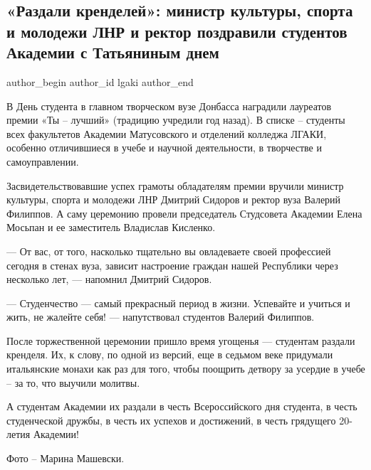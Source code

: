  
 
 
 
 
 
\subsection{«Раздали кренделей»: министр культуры, спорта и молодежи ЛНР и ректор поздравили студентов Академии с Татьяниным днем}
\label{sec:25_01_2022.stz.edu.lnr.lgaki.1.razdali_krendelej_tatjanin_den}
 
\ifcmt
 author_begin
   author_id lgaki
 author_end
\fi

В День студента в главном творческом вузе Донбасса наградили лауреатов премии
«Ты – лучший» (традицию учредили год назад). В списке – студенты всех
факультетов Академии Матусовского и отделений колледжа ЛГАКИ, особенно
отличившиеся в учебе и научной деятельности, в творчестве и самоуправлении.


Засвидетельствовавшие успех грамоты обладателям премии вручили министр
культуры, спорта и молодежи ЛНР Дмитрий Сидоров и ректор вуза Валерий Филиппов.
А саму церемонию провели председатель Студсовета Академии Елена Мосьпан и ее
заместитель Владислав Кисленко.


— От вас, от того, насколько тщательно вы овладеваете своей профессией сегодня
в стенах вуза, зависит настроение граждан нашей Республики через несколько лет,
— напомнил Дмитрий Сидоров.

— Студенчество — самый прекрасный период в жизни. Успевайте и учиться и жить,
не жалейте себя! — напутствовал студентов Валерий Филиппов.

После торжественной церемонии пришло время угощенья — студентам раздали
кренделя. Их, к слову, по одной из версий, еще в седьмом веке придумали
итальянские монахи как раз для того, чтобы поощрить детвору за усердие в учебе
– за то, что выучили молитвы.

А студентам Академии их раздали в честь Всероссийского дня студента, в честь
студенческой дружбы, в честь их успехов и достижений, в честь грядущего
20-летия Академии!

Фото – Марина Машевски.
